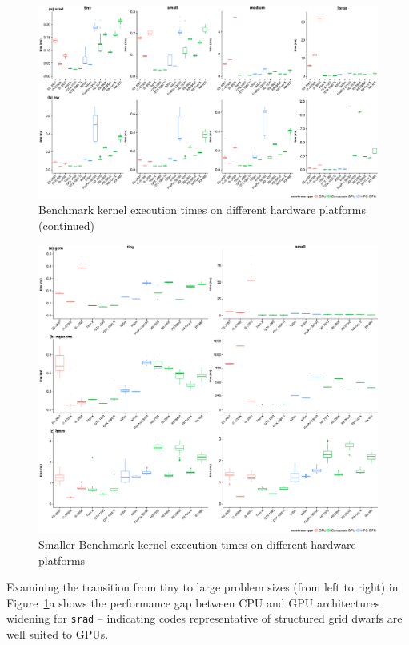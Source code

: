 \documentclass[../document.tex]{subfiles}
\begin{document}
\begin{figure}[t]
    \centering
    \includegraphics[width=\textwidth,keepaspectratio]{figures/new-time-results/generate_main_4x2_bandwplot}
    \caption{Benchmark kernel execution times on different hardware platforms (continued)}
    \label{fig:time2}
\end{figure}

\begin{figure}
    \centering
    \includegraphics[width=\textwidth,keepaspectratio]{figures/new-time-results/generate_main_2x3_bandwplot}
    \caption{Smaller Benchmark kernel execution times on different hardware platforms}
    \label{fig:time3}
\end{figure}


Examining the transition from tiny to large problem sizes (from left to right) in Figure~\ref{fig:time2}a shows the performance gap between CPU and GPU architectures widening for {\tt srad} -- indicating codes representative of structured grid dwarfs are well suited to GPUs.
\end{document}

